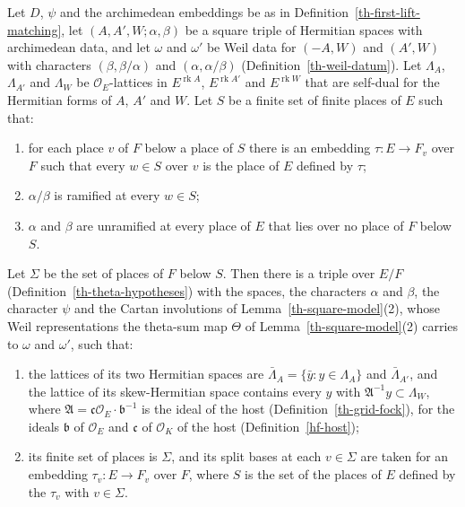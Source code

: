 \begin{lemma}\label{th-bottom-split-reading}
Let $D$, $\psi$ and the archimedean embeddings be as in
Definition~\ref{th-first-lift-matching}, let $(A,A',W;\alpha,\beta)$ be a
square triple of Hermitian spaces with archimedean data, and let $\omega$ and
$\omega'$ be Weil data for $(-A,W)$ and $(A',W)$ with characters
$(\beta,\beta/\alpha)$ and $(\alpha,\alpha/\beta)$
(Definition~\ref{th-weil-datum}). Let $\Lambda_A$, $\Lambda_{A'}$ and
$\Lambda_W$ be $\mathcal O_E$-lattices in $E^{\operatorname{rk}A}$,
$E^{\operatorname{rk}A'}$ and $E^{\operatorname{rk}W}$ that are self-dual for
the Hermitian forms of $A$, $A'$ and $W$. Let $S$ be a finite set of finite
places of $E$ such that:
\begin{enumerate}
\item[(i)] for each place $v$ of $F$ below a place of $S$ there is an
  embedding $\tau\colon E\to F_v$ over $F$ such that every $w\in S$ over $v$ is
  the place of $E$ defined by $\tau$;
\item[(ii)] $\alpha/\beta$ is ramified at every $w\in S$;
\item[(iii)] $\alpha$ and $\beta$ are unramified at every place of $E$ that
  lies over no place of $F$ below $S$.
\end{enumerate}
Let $\Sigma$ be the set of places of $F$ below $S$. Then there is a triple over
$E/F$ (Definition~\ref{th-theta-hypotheses}) with the spaces, the characters
$\alpha$ and $\beta$, the character $\psi$ and the Cartan involutions of
Lemma~\ref{th-square-model}(2), whose Weil representations the theta-sum map
$\Theta$ of Lemma~\ref{th-square-model}(2) carries to $\omega$ and $\omega'$,
such that:
\begin{enumerate}
\item the lattices of its two Hermitian spaces are
  $\bar\Lambda_A=\{\bar y:y\in\Lambda_A\}$ and $\bar\Lambda_{A'}$, and the
  lattice of its skew-Hermitian space contains every $y$ with
  $\mathfrak A^{-1}y\subset\Lambda_W$, where
  $\mathfrak A=\mathfrak c\mathcal O_E\cdot\mathfrak b^{-1}$ is the ideal of the
  host (Definition~\ref{th-grid-fock}), for the ideals $\mathfrak b$ of
  $\mathcal O_E$ and $\mathfrak c$ of $\mathcal O_K$ of the host
  (Definition~\ref{hf-host});
\item its finite set of places is $\Sigma$, and its split bases at each
  $v\in\Sigma$ are taken for an embedding $\tau_v\colon E\to F_v$ over $F$,
  where $S$ is the set of the places of $E$ defined by the $\tau_v$ with
  $v\in\Sigma$.
\end{enumerate}
\end{lemma}
